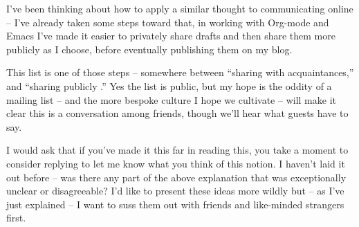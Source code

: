\documentclass[11pt]{article}
\begin{document}
\begin{itemize}
I’ve been thinking about how to apply a similar thought to communicating online – I’ve already taken some steps toward that, in working with Org-mode and Emacs I’ve made it easier to privately share drafts and then share them more publicly as I choose, before eventually publishing them on my blog.

This list is one of those steps – somewhere between “sharing with acquaintances,” and “sharing publicly .” Yes the list is public, but my hope is the oddity of a mailing list – and the more bespoke culture I hope we cultivate – will make it clear this is a conversation among friends, though we’ll hear what guests have to say.

I would ask that if you’ve made it this far in reading this, you take a moment to consider replying to let me know what you think of this notion. I haven’t laid it out before – was there any part of the above explanation that was exceptionally unclear or disagreeable? I’d like to present these ideas more wildly but – as I’ve just explained – I want to suss them out with friends and like-minded strangers first.
\end{itemize}
\stopcontents[level-4]
\end{document}
